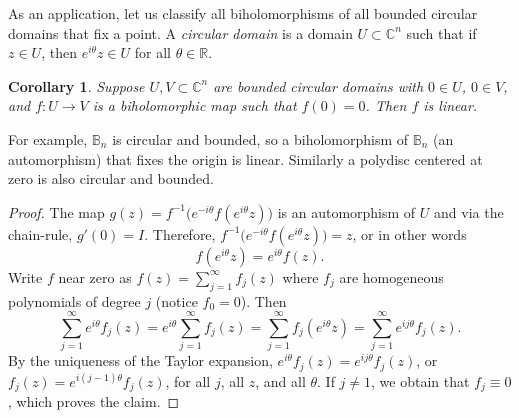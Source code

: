 \documentclass[12pt,openany]{book}
\newcommand{\C}{{\mathbb{C}}}
\newcommand{\R}{{\mathbb{R}}}
\newcommand{\bB}{{\mathbb{B}}}
\newcommand{\myindex}[1]{#1\index{#1}}
\theoremstyle{plain}
\newtheorem{cor}[thm]{Corollary}
\theoremstyle{remark}
\theoremstyle{definition}
\theoremstyle{exercise}
\theoremstyle{example}
\begin{document}
As an application, let us classify all biholomorphisms of all bounded
circular domains that fix a point.
A \emph{\myindex{circular domain}} is a domain
$U \subset \C^n$ such that if $z \in U$, then $e^{i\theta} z \in U$ for
all $\theta \in \R$.

\begin{cor}
Suppose $U, V \subset \C^n$ are bounded circular domains with $0 \in U$, $0 \in
V$, and $f \colon U \to V$ is
a biholomorphic map such that $f(0) = 0$.  Then $f$ is linear.
\end{cor}

For example, $\bB_n$ is circular and bounded, so a biholomorphism of $\bB_n$
(an automorphism)
that fixes the origin is linear.  Similarly a polydisc centered at zero is
also circular and bounded.

\begin{proof}
The map $g(z) = f^{-1}\bigl(e^{-i\theta}f(e^{i\theta} z)\bigr)$ is an
automorphism of $U$ and via the
chain-rule, $g'(0) = I$.  Therefore,
$f^{-1}\bigl(e^{-i\theta}f(e^{i\theta} z)\bigr) = z$, or in other words
\begin{equation*}
f(e^{i\theta} z) = e^{i\theta}f(z) .
\end{equation*}
Write $f$ near zero as $f(z) = \sum_{j=1}^\infty f_j(z)$ where $f_j$ are
homogeneous polynomials of degree $j$ (notice $f_0 = 0$).  Then
\begin{equation*}
\sum_{j=1}^\infty e^{i\theta} f_j(z) 
=
e^{i\theta} \sum_{j=1}^\infty f_j(z) 
=
\sum_{j=1}^\infty f_j(e^{i\theta} z)
=
\sum_{j=1}^\infty e^{ij\theta}f_j(z) .
\end{equation*}
By the uniqueness of the Taylor expansion, 
$e^{i\theta} f_j(z)  = e^{ij\theta} f_j(z)$, or
$f_j(z)  = e^{i(j-1)\theta} f_j(z)$,
for all $j$, all $z$, and all $\theta$.
If $j\not=1$, we obtain that $f_j \equiv
0$, which proves the claim.
\end{proof}
\end{document}
